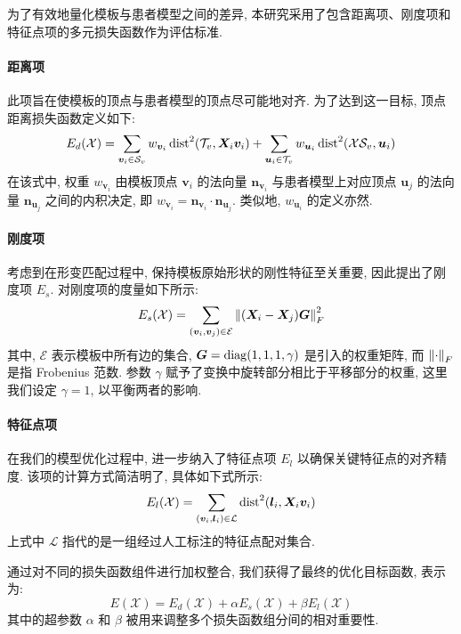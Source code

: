 为了有效地量化模板与患者模型之间的差异, 本研究采用了包含距离项、刚度项和特征点项的多元损失函数作为评估标准.

\paragraph{距离项}
此项旨在使模板的顶点与患者模型的顶点尽可能地对齐.
为了达到这一目标, 顶点距离损失函数定义如下:
\begin{equation}
  E_d(\mathcal{X}) = \sum_{\bm{v}_i \in \mathcal{S}_v} w_{\bm{v}_i} \operatorname{dist}^2(\mathcal{T}_v, \bm{X}_i \bm{v}_i) + \sum_{\bm{u}_i \in \mathcal{T}_v} w_{\bm{u}_i} \operatorname{dist}^2(\mathcal{X} \mathcal{S}_v, \bm{u}_i)
\end{equation}
在该式中, 权重 $w_{\bm{v}_i}$ 由模板顶点 $\bm{v}_i$ 的法向量 $\bm{n}_{\bm{v}_i}$ 与患者模型上对应顶点 $\bm{u}_j$ 的法向量 $\bm{n}_{\bm{u}_j}$ 之间的内积决定, 即 $w_{\bm{v}_i} = \bm{n}_{\bm{v}_i} \cdot \bm{n}_{\bm{u}_j}$.
类似地, $w_{\bm{u}_i}$ 的定义亦然.

\paragraph{刚度项}
考虑到在形变匹配过程中, 保持模板原始形状的刚性特征至关重要, 因此提出了刚度项 $E_s$.
对刚度项的度量如下所示:
\begin{equation}
  E_s(\mathcal{X}) = \sum_{(\bm{v}_i, \bm{v}_j) \in \mathcal{E}} \norm{(\bm{X}_i - \bm{X}_j) \bm{G}}_F^2
\end{equation}
其中, $\mathcal{E}$ 表示模板中所有边的集合, $\bm{G} = \operatorname{diag}(1, 1, 1, \gamma)$ 是引入的权重矩阵, 而 $\norm{\cdot}_F$ 是指 Frobenius 范数.
参数 $\gamma$ 赋予了变换中旋转部分相比于平移部分的权重, 这里我们设定 $\gamma = 1$, 以平衡两者的影响.

\paragraph{特征点项}
在我们的模型优化过程中, 进一步纳入了特征点项 $E_l$ 以确保关键特征点的对齐精度.
该项的计算方式简洁明了, 具体如下式所示:
\begin{equation}
  E_l(\mathcal{X}) = \sum_{(\bm{v}_i, \bm{l}_i) \in \mathcal{L}} \operatorname{dist}^2(\bm{l}_i, \bm{X}_i \bm{v}_i)
\end{equation}
上式中 $\mathcal{L}$ 指代的是一组经过人工标注的特征点配对集合.

通过对不同的损失函数组件进行加权整合, 我们获得了最终的优化目标函数, 表示为:
\begin{equation}
  E(\mathcal{X}) = E_d(\mathcal{X}) + \alpha E_s(\mathcal{X}) + \beta E_l(\mathcal{X})
\end{equation}
其中的超参数 $\alpha$ 和 $\beta$ 被用来调整多个损失函数组分间的相对重要性.

